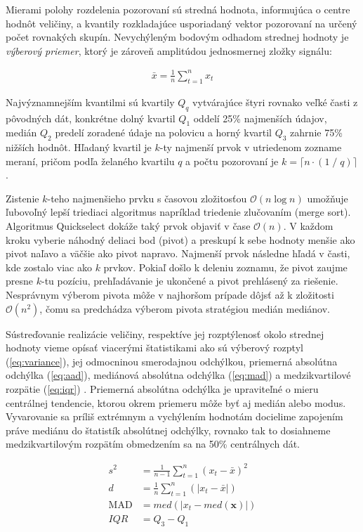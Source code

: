 Mierami polohy rozdelenia pozorovaní sú stredná hodnota, informujúca
o centre hodnôt veličiny, a kvantily rozkladajúce usporiadaný vektor pozorovaní na určený počet rovnakých skupín.
Nevychýleným bodovým odhadom strednej hodnoty je \emph{výberový priemer}, ktorý je zároveň amplitúdou jednosmernej zložky signálu:
\begin{ceqn}\begin{align}
\bar{x} = \frac{1}{n} \sum_{t = 1}^{n}{x_t}
\end{align}\end{ceqn}

Najvýznamnejším kvantilmi sú kvartily $Q_q$ vytvárajúce štyri rovnako veľké časti z pôvodných dát, konkrétne dolný kvartil $Q_1$
oddelí  25\% najmenších údajov, medián $Q_2$ predelí zoradené údaje na polovicu a horný kvartil $Q_3$ zahrnie 75\% nižších hodnôt.
Hľadaný kvartil je $k$-ty najmenší prvok v utriedenom zozname meraní, pričom podľa želaného kvartilu $q$ a počtu pozorovaní je
$k = \lceil n \cdot (1\;/\;q) \rceil$.

Zistenie $k$-teho najmenšieho prvku s časovou zložitosťou $\mathcal{O}(n \log n)$ umožňuje ľubovoľný lepší triediaci algoritmus
napríklad triedenie zlučovaním (merge sort). Algoritmus Quickselect dokáže taký prvok objaviť v čase $\mathcal{O}(n)$.
V každom kroku vyberie náhodný deliaci bod (pivot) a preskupí k sebe hodnoty menšie ako pivot naľavo a väčšie ako pivot
napravo. Najmenší prvok následne hľadá v časti, kde zostalo viac ako $k$ prvkov. Pokiaľ došlo k deleniu zoznamu, že pivot
zaujme presne $k$-tu pozíciu, prehľadávanie je ukončené a pivot prehlásený za riešenie. Nesprávnym výberom pivota môže
v najhoršom prípade dôjsť až k zložitosti $\mathcal{O}(n^2)$, čomu sa predchádza výberom pivota stratégiou medián mediánov.

Sústreďovanie realizácie veličiny, respektíve jej rozptýlenosť okolo strednej hodnoty vieme opísať viacerými štatistikami
ako sú výberový rozptyl (\ref{eq:variance}), jej odmocninou smerodajnou odchýlkou,
priemerná absolútna odchýlka (\ref{eq:aad}), mediánová absolútna odchýlka (\ref{eq:mad})
a medzikvartilové rozpätie (\ref{eq:iqr}) \cite{zaklady-statistiky}. Priemerná absolútna odchýlka je
upraviteľné o mieru centrálnej tendencie, ktorou okrem priemeru môže byť aj medián alebo modus. Vyvarovanie sa
príliš extrémnym a vychýlením hodnotám docielime zapojením práve mediánu do štatistík absolútnej odchýlky, rovnako
tak to dosiahneme medzikvartilovým rozpätím obmedzením sa na 50\% centrálnych dát.
\begin{ceqn}\begin{align}
	s^2 &= \frac{1}{n - 1} \sum_{t = 1}^{n}{(x_t - \bar{x})^2} \label{eq:variance} \\
	d &= \frac{1}{n} \sum_{t = 1}^{n}(|x_t - \bar{x}|) \label{eq:aad} \\
	\mathrm{MAD} &= med(|x_t - med(\mathbf{x})|) \label{eq:mad} \\
	IQR &= Q_3 - Q_1 \label{eq:iqr}
\end{align}\end{ceqn}


